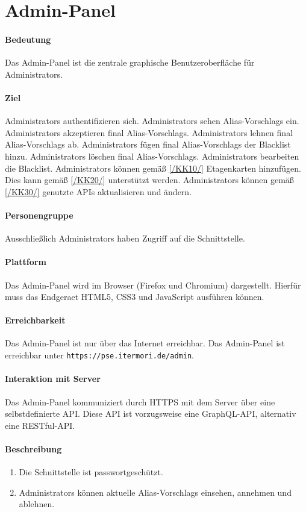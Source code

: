 \newpage
\section{Admin-Panel}
\label{Admin-Panel}

\paragraph{Bedeutung}
Das \Gls{Admin-Panel} ist die zentrale graphische Benutzeroberfläche für \Glspl{Administrator}.

\paragraph{Ziel}
\Glspl{Administrator} authentifizieren sich.
\Glspl{Administrator} sehen \Glspl{Alias-Vorschlag} ein.
\Glspl{Administrator} akzeptieren final \Glspl{Alias-Vorschlag}.
\Glspl{Administrator} lehnen final \Glspl{Alias-Vorschlag} ab.
\Glspl{Administrator} fügen final \Glspl{Alias-Vorschlag} der \Gls{Blacklist} hinzu.
\Glspl{Administrator} löschen final \Glspl{Alias-Vorschlag}.
\Glspl{Administrator} bearbeiten die \Gls{Blacklist}.
\Glspl{Administrator} können gemäß \ref{/KK10/} Etagenkarten hinzufügen. Dies kann gemäß \ref{/KK20/} unterstützt werden.
\Glspl{Administrator} können gemäß \ref{/KK30/} genutzte \Gls{API}s aktualisieren und ändern.

\paragraph{Personengruppe}
Ausschließlich \Glspl{Administrator} haben Zugriff auf die \Gls{Schnittstelle}.

\paragraph{Plattform}
Das \Gls{Admin-Panel} wird im \Gls{Browser} (\Gls{Firefox} und \Gls{Chromium}) dargestellt.
Hierfür muss das \Gls{Endgeraet} \Gls{HTML5}, \Gls{CSS3} und \Gls{JavaScript} ausführen können.

\paragraph{Erreichbarkeit}
Das \Gls{Admin-Panel} ist nur über das Internet erreichbar. 
Das \Gls{Admin-Panel} ist erreichbar unter \texttt{https://pse.itermori.de/admin}.

\paragraph{Interaktion mit Server}
Das \Gls{Admin-Panel} kommuniziert durch \Gls{HTTPS} mit dem \Gls{Server} über eine selbstdefinierte \Gls{API}.
Diese \Gls{API} ist vorzugsweise eine \Gls{GraphQL}-\Gls{API}, alternativ eine \Gls{REST}ful-\Gls{API}.

\paragraph{Beschreibung}
\begin{enumerate}
    \item Die \Gls{Schnittstelle} ist passwortgeschützt.
    \item \Glspl{Administrator} können aktuelle \Glspl{Alias-Vorschlag} einsehen, annehmen und ablehnen.
\end{enumerate}
